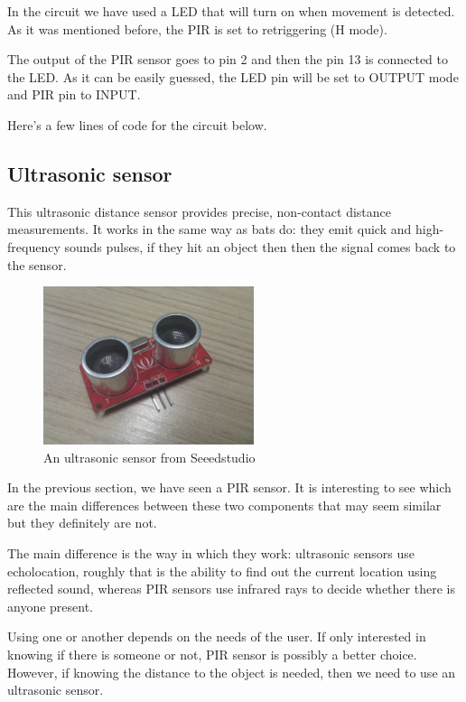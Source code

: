 In the circuit we have used a LED that will turn on when movement is detected. As it was mentioned before, the PIR is set to retriggering (H mode).

The output of the PIR sensor goes to pin 2 and then the pin 13 is connected to the LED. As it can be easily guessed, the LED pin will be set to OUTPUT mode and PIR pin to INPUT.

Here's a few lines of code for the circuit below.



\subsection{Ultrasonic sensor}
This ultrasonic distance sensor provides precise, non-contact distance measurements. It works in the same way as bats do: they emit quick and high-frequency sounds pulses, if they hit an object then then the signal comes back to the sensor.

\begin{figure}[H]
    \centering
    \includegraphics[width=0.55\textwidth]{fig/ultrasonic.jpg}
    \caption{An ultrasonic sensor from Seeedstudio}
    \label{fig:ultrasonic}
\end{figure}

In the previous section, we have seen a PIR sensor. It is interesting to see which are the main differences between these two components that may seem similar but they definitely are not.

	The main difference is the way in which they work: ultrasonic sensors use echolocation\cite{echolocation}, roughly that is the ability to find out the current location using reflected sound, whereas PIR sensors use infrared rays to decide whether there is anyone present.

	Using one or another depends on the needs of the user. If only interested in knowing if there is someone or not, PIR sensor is possibly a better choice. However, if knowing the distance to the object is needed, then we need to use an ultrasonic sensor.

